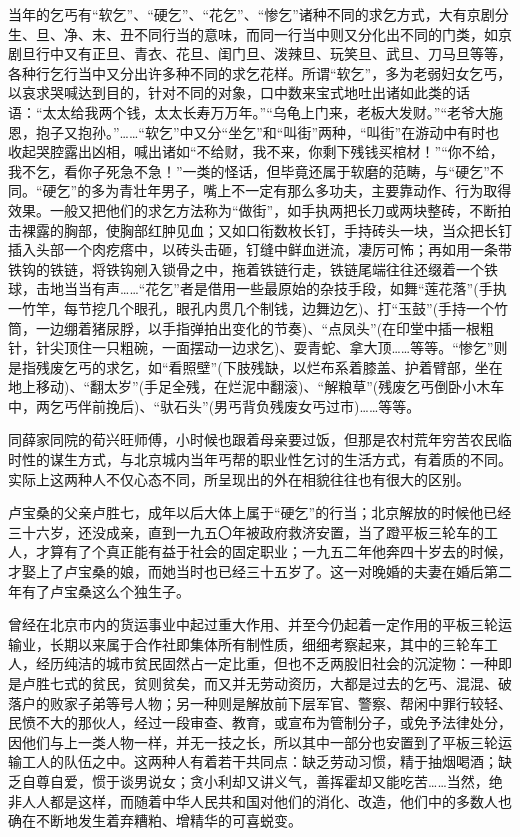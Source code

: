 \par 当年的乞丐有“软乞”、“硬乞”、“花乞”、“惨乞”诸种不同的求乞方式，大有京剧分生、旦、净、末、丑不同行当的意味，而同一行当中则又分化出不同的门类，如京剧旦行中又有正旦、青衣、花旦、闺门旦、泼辣旦、玩笑旦、武旦、刀马旦等等，各种行乞行当中又分出许多种不同的求乞花样。所谓“软乞”，多为老弱妇女乞丐，以哀求哭喊达到目的，针对不同的对象，口中数来宝式地吐出诸如此类的话语：“太太给我两个钱，太太长寿万万年。”“乌龟上门来，老板大发财。”“老爷大施恩，抱子又抱孙。”……“软乞”中又分“坐乞”和“叫街”两种，“叫街”在游动中有时也收起哭腔露出凶相，喊出诸如“不给财，我不来，你剩下残钱买棺材！”“你不给，我不乞，看你子死急不急！”一类的怪话，但毕竟还属于软磨的范畴，与“硬乞”不同。“硬乞”的多为青壮年男子，嘴上不一定有那么多功夫，主要靠动作、行为取得效果。一般又把他们的求乞方法称为“做街”，如手执两把长刀或两块整砖，不断拍击裸露的胸部，使胸部红肿见血；又如口衔数枚长钉，手持砖头一块，当众把长钉插入头部一个肉疙瘩中，以砖头击砸，钉缝中鲜血迸流，凄厉可怖；再如用一条带铁钩的铁链，将铁钩剜入锁骨之中，拖着铁链行走，铁链尾端往往还缀着一个铁球，击地当当有声……“花乞”者是借用一些最原始的杂技手段，如舞“莲花落”(手执一竹竿，每节挖几个眼孔，眼孔内贯几个制钱，边舞边乞)、打“玉鼓”(手持一个竹筒，一边绷着猪尿脬，以手指弹拍出变化的节奏)、“点凤头”(在印堂中插一根粗针，针尖顶住一只粗碗，一面摆动一边求乞)、耍青蛇、拿大顶……等等。“惨乞”则是指残废乞丐的求乞，如“看照壁”(下肢残缺，以烂布系着膝盖、护着臂部，坐在地上移动)、“翻太岁”(手足全残，在烂泥中翻滚)、“解粮草”(残废乞丐倒卧小木车中，两乞丐伴前挽后)、“驮石头”(男丐背负残废女丐过市)……等等。
\par 同薛家同院的荀兴旺师傅，小时候也跟着母亲要过饭，但那是农村荒年穷苦农民临时性的谋生方式，与北京城内当年丐帮的职业性乞讨的生活方式，有着质的不同。实际上这两种人不仅心态不同，所呈现出的外在相貌往往也有很大的区别。
\par 卢宝桑的父亲卢胜七，成年以后大体上属于“硬乞”的行当；北京解放的时候他已经三十六岁，还没成亲，直到一九五〇年被政府救济安置，当了蹬平板三轮车的工人，才算有了个真正能有益于社会的固定职业；一九五二年他奔四十岁去的时候，才娶上了卢宝桑的娘，而她当时也已经三十五岁了。这一对晚婚的夫妻在婚后第二年有了卢宝桑这么个独生子。
\par 曾经在北京市内的货运事业中起过重大作用、并至今仍起着一定作用的平板三轮运输业，长期以来属于合作社即集体所有制性质，细细考察起来，其中的三轮车工人，经历纯洁的城市贫民固然占一定比重，但也不乏两股旧社会的沉淀物：一种即是卢胜七式的贫民，贫则贫矣，而又并无劳动资历，大都是过去的乞丐、混混、破落户的败家子弟等号人物；另一种则是解放前下层军官、警察、帮闲中罪行较轻、民愤不大的那伙人，经过一段审查、教育，或宣布为管制分子，或免予法律处分，因他们与上一类人物一样，并无一技之长，所以其中一部分也安置到了平板三轮运输工人的队伍之中。这两种人有着若干共同点：缺乏劳动习惯，精于抽烟喝酒；缺乏自尊自爱，惯于谈男说女；贪小利却又讲义气，善挥霍却又能吃苦……当然，绝非人人都是这样，而随着中华人民共和国对他们的消化、改造，他们中的多数人也确在不断地发生着弃糟粕、增精华的可喜蜕变。
